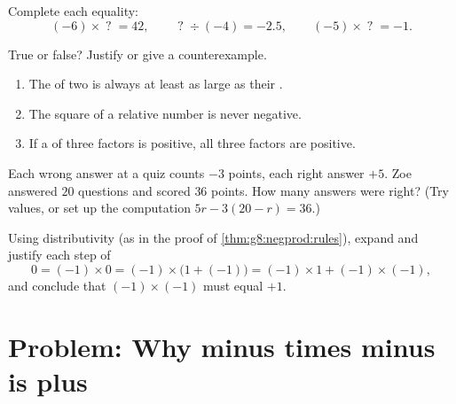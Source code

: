 \begin{exercise}[$\star\star$]\label{exo:g8:negprod:8}
Complete each equality:
\[
(-6) \times \;?\; = 42, \qquad
\;?\; \div (-4) = -2.5, \qquad
(-5) \times \;?\; = -1 .
\]
\end{exercise}

\begin{exercise}[$\star\star$]\label{exo:g8:negprod:9}
True or false? Justify or give a counterexample.
\begin{enumerate}
  \item The  of two  is always at least as
        large as their .
  \item The square of a relative number is never negative.
  \item If a  of three factors is positive, all three factors
        are positive.
\end{enumerate}
\end{exercise}

\begin{exercise}[$\star\star$]\label{exo:g8:negprod:10}
Each wrong answer at a quiz counts $-3$ points, each right answer
$+5$. Zoe answered $20$ questions and scored $36$ points. How many
answers were right? (Try values, or set up the computation
$5r - 3(20 - r) = 36$.)
\end{exercise}

\begin{exercise}[$\star\star\star$]\label{exo:g8:negprod:11}
Using distributivity (as in the proof of
\cref{thm:g8:negprod:rules}), expand and justify each step of
\[
0 = (-1) \times 0 = (-1) \times \bigl(1 + (-1)\bigr)
= (-1) \times 1 + (-1) \times (-1),
\]
and conclude that $(-1) \times (-1)$ must equal $+1$.
\end{exercise}

\section{Problem: Why minus times minus is plus}

